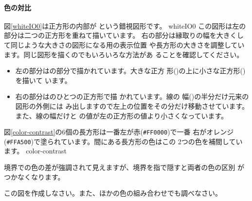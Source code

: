 \iffalse
ここでは属性を別々に指定していますがこれらをまとめて指定できる
\Attrib{style} という属性もあります。この場合は次のように指定できます。
\begin{center}
 \Attrib{style}\Showattrib{="fill:black;stroke:red;stroke-width:4"}
\end{center}
\Showattrib{name="value"}の代わりに \Showattrib{name:value} と表し、属性
同士の間は \Showattrib{;}(セミコロン)で区切ります。
\fi
%
\newpage
\paragraph{色の対比}
図\ref{whiteIO0}は正方形の内部が
という錯視図形です。
{whiteIO0}
この図形は左の部分は二つの正方形を重ねて描いています。
右の部分は縁取りの幅を大きくして同じような大きさの図形になる用の表示位置
や長方形の大きさを調整しています。同じ図形を描くのでもいろいろな方法があ
ることを確認してください。
\begin{itemize}
 \item 左の部分はの部分で描かれています。大きな正方
       形()の上に小さな正方形()を描いて
       います。
 \item 右の部分はのひとつの正方形で描
       かれています。線の
       幅()の半分だけ元来の図形の外側には
       み出しますので左上の位置をその分だけ移動させています。
       また、線の幅だけと
       の値が左の正方形の値より小さくなっています。
\end{itemize}
\begin{Problem}\upshape\label{prob-contrast}
図\ref{color-contrast}の6個の長方形は一番左が赤(\texttt{\#FF0000})で一番
 右がオレンジ(\texttt{\#FFA500})で塗られています。間にある長方形の色はこの
 2つの色を補間しています\cite[カラー図版3]{Ninio}。
{\protect{}}{color-contrast}

境界での色の差が強調されて見えますが、境界を指で隠すと両者の色の区別
 がつかなくなります。

この図を作成しなさい。また、ほかの色の組み合わせでも調べなさい。
\end{Problem}
